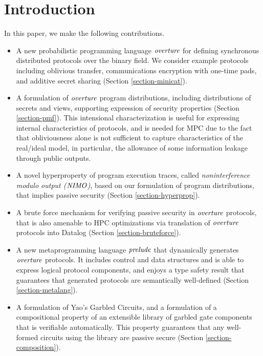 \section{Introduction}

In this paper, we make the following contributions.
\begin{itemize}
\item A new probabilistic programming language $\mathit{overture}$ for defining
  synchronous distributed protocols over the binary field. We consider example
  protocols including oblivious transfer, communications encryption with one-time
  pads, and additive secret sharing (Section \ref{section-minicat}).
\item A formulation of $\mathit{overture}$ program distributions, including
  distributions of secrets and views, supporting expression of security
  properties (Section \ref{section-pmf}). This intensional characterization
  is useful for expressing internal characteristics of protocols, and
  is needed for MPC due to the fact that obliviousness alone is not sufficient
  to capture characteristics of the real/ideal model, in particular, the
  allowance of some information leakage through public outputs. 
\item A novel hyperproperty of program execution traces, called
  \emph{noninterference modulo output ($\mathit{NIMO}$)}, based on our
  formulation of program distributions, that implies passive security
  (Section \ref{section-hyperprop}).
\item A brute force mechanism for verifying passive security in
  $\mathit{overture}$ protocols, that is also amenable to HPC optimizations via
  translation of $\mathit{overture}$ protocols into Datalog (Section \ref{section-bruteforce}). 
\item A new metaprogramming language $\mathit{prelude}$ that dynamically
  generates $\mathit{overture}$ protocols. It includes control and data structures
  and is able to express logical protocol components, and enjoys a
  type safety result that guarantees that generated protocols
  are semantically well-defined (Section \ref{section-metalang}).
\item A formulation of Yao's Garbled Circuits, and a formulation of a
  compositional property of an extensible library of garbled gate
  components that is verifiable automatically. This property
  guarantees that any well-formed circuits using the library are
  passive secure (Section \ref{section-composition}).
\end{itemize}

